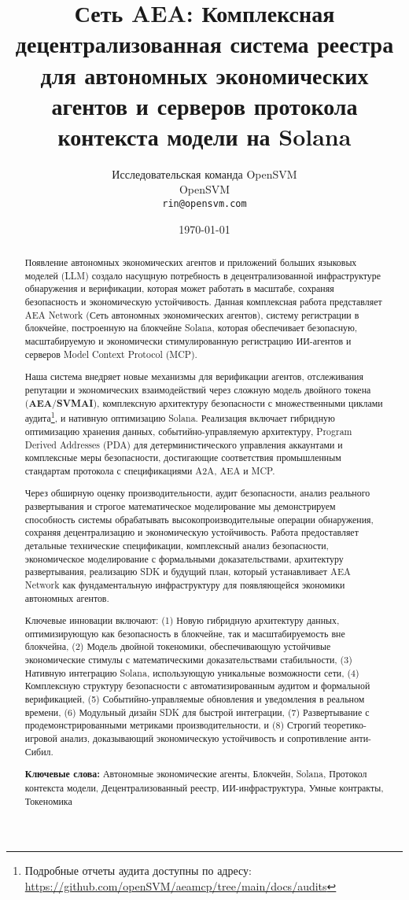 \documentclass[12pt,a4paper]{article}
\title{Сеть AEA: Комплексная децентрализованная система реестра для автономных экономических агентов и серверов протокола контекста модели на Solana}
\author{Исследовательская команда OpenSVM\\
OpenSVM\\
\texttt{rin@opensvm.com}}
\date{\today}
\begin{document}
\maketitle

\begin{abstract}
Появление автономных экономических агентов и приложений больших языковых моделей (LLM) создало насущную потребность в децентрализованной инфраструктуре обнаружения и верификации, которая может работать в масштабе, сохраняя безопасность и экономическую устойчивость. Данная комплексная работа представляет AEA Network (Сеть автономных экономических агентов), систему регистрации в блокчейне, построенную на блокчейне Solana, которая обеспечивает безопасную, масштабируемую и экономически стимулированную регистрацию ИИ-агентов и серверов Model Context Protocol (MCP).

Наша система внедряет новые механизмы для верификации агентов, отслеживания репутации и экономических взаимодействий через сложную модель двойного токена (\textbf{AEA}/\textbf{SVMAI}), комплексную архитектуру безопасности с множественными циклами аудита\footnote{Подробные отчеты аудита доступны по адресу: \url{https://github.com/openSVM/aeamcp/tree/main/docs/audits}}, и нативную оптимизацию Solana. Реализация включает гибридную оптимизацию хранения данных, событийно-управляемую архитектуру, Program Derived Addresses (PDA) для детерминистического управления аккаунтами и комплексные меры безопасности, достигающие соответствия промышленным стандартам протокола с спецификациями A2A, AEA и MCP.

Через обширную оценку производительности, аудит безопасности, анализ реального развертывания и строгое математическое моделирование мы демонстрируем способность системы обрабатывать высокопроизводительные операции обнаружения, сохраняя децентрализацию и экономическую устойчивость. Работа предоставляет детальные технические спецификации, комплексный анализ безопасности, экономическое моделирование с формальными доказательствами, архитектуру развертывания, реализацию SDK и будущий план, который устанавливает AEA Network как фундаментальную инфраструктуру для появляющейся экономики автономных агентов.

Ключевые инновации включают: (1) Новую гибридную архитектуру данных, оптимизирующую как безопасность в блокчейне, так и масштабируемость вне блокчейна, (2) Модель двойной токеномики, обеспечивающую устойчивые экономические стимулы с математическими доказательствами стабильности, (3) Нативную интеграцию Solana, использующую уникальные возможности сети, (4) Комплексную структуру безопасности с автоматизированным аудитом и формальной верификацией, (5) Событийно-управляемые обновления и уведомления в реальном времени, (6) Модульный дизайн SDK для быстрой интеграции, (7) Развертывание с продемонстрированными метриками производительности, и (8) Строгий теоретико-игровой анализ, доказывающий экономическую устойчивость и сопротивление анти-Сибил.

\textbf{Ключевые слова:} Автономные экономические агенты, Блокчейн, Solana, Протокол контекста модели, Децентрализованный реестр, ИИ-инфраструктура, Умные контракты, Токеномика
\end{abstract}
\end{document}
